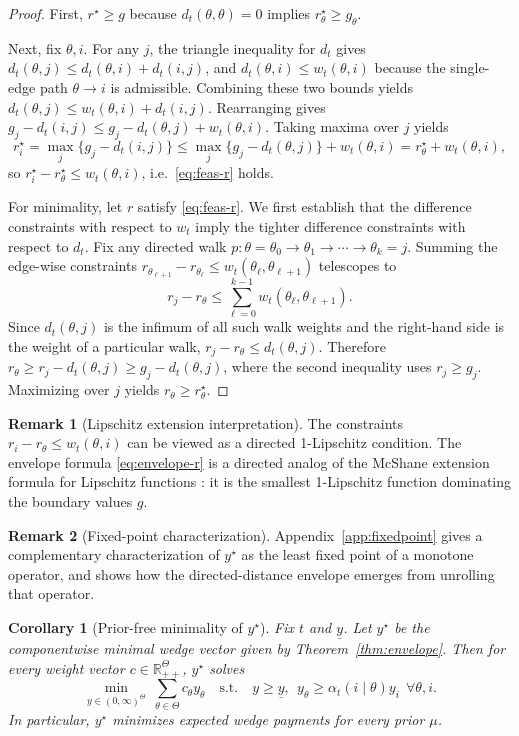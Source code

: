 \documentclass[final,3p,times]{elsarticle}
\theoremstyle{plain}
\newtheorem{corollary}{Corollary}
\theoremstyle{definition}
\newtheorem{remark}{Remark}
\newcommand{\R}{\mathbb{R}}
\newcommand{\1}{\mathbbm{1}}
\newcommand{\ThetaSet}{\Theta}
\begin{document}
\begin{proof}
First, $r^\star\ge g$ because $d_t(\theta,\theta)=0$ implies $r^\star_\theta\ge g_\theta$. 

Next, fix $\theta,i$. For any $j$, the triangle inequality for $d_t$ gives $d_t(\theta,j)\le d_t(\theta,i)+d_t(i,j)$, and $d_t(\theta,i)\le w_t(\theta,i)$ because the single-edge path $\theta\to i$ is admissible. Combining these two bounds yields $d_t(\theta,j)\le w_t(\theta,i)+d_t(i,j)$.
Rearranging gives $g_j-d_t(i,j)\le g_j-d_t(\theta,j)+w_t(\theta,i)$. Taking maxima over $j$ yields
\[
r^\star_i=\max_j\{g_j-d_t(i,j)\}\le \max_j\{g_j-d_t(\theta,j)\}+w_t(\theta,i)=r^\star_\theta+w_t(\theta,i),
\]
so $r^\star_i-r^\star_\theta\le w_t(\theta,i)$, i.e.\ \eqref{eq:feas-r} holds.

For minimality, let $r$ satisfy \eqref{eq:feas-r}. We first establish that the difference constraints with respect to $w_t$ imply the tighter difference constraints with respect to $d_t$. Fix any directed walk $p:\theta=\theta_0\to\theta_1\to\cdots\to\theta_k=j$. Summing the edge-wise constraints $r_{\theta_{\ell+1}}-r_{\theta_\ell}\le w_t(\theta_\ell,\theta_{\ell+1})$ telescopes to
\[
r_j-r_\theta \le \sum_{\ell=0}^{k-1} w_t(\theta_\ell,\theta_{\ell+1}).
\]
Since $d_t(\theta,j)$ is the infimum of all such walk weights and the right-hand side is the weight of a particular walk, $r_j-r_\theta\le d_t(\theta,j)$. Therefore $r_\theta\ge r_j-d_t(\theta,j)\ge g_j-d_t(\theta,j)$, where the second inequality uses $r_j\ge g_j$. Maximizing over $j$ yields $r_\theta\ge r^\star_\theta$.
\end{proof}

\begin{remark}[Lipschitz extension interpretation]
The constraints $r_i-r_\theta\le w_t(\theta,i)$ can be viewed as a directed 1-Lipschitz condition. The envelope formula \eqref{eq:envelope-r} is a directed analog of the McShane extension formula for Lipschitz functions \citep{McShane1934,Petrakis2020}: it is the smallest 1-Lipschitz function dominating the boundary values $g$.
\end{remark}

\begin{remark}[Fixed-point characterization]
Appendix~\ref{app:fixedpoint} gives a complementary characterization of $y^\star$ as the least fixed point of a monotone
operator, and shows how the directed-distance envelope emerges from unrolling that operator.
\end{remark}

\begin{corollary}[Prior-free minimality of $y^\star$]\label{cor:priorfree}
Fix $t$ and $\underline y$. Let $y^\star$ be the componentwise minimal wedge vector given by Theorem~\ref{thm:envelope}.
Then for every weight vector $c\in\R_{++}^{\ThetaSet}$, $y^\star$ solves
\[
\min_{y\in(0,\infty)^{\ThetaSet}}\ \sum_{\theta\in\ThetaSet} c_\theta y_\theta
\quad\text{s.t.}\quad
y\ge \underline y,\ \ y_\theta\ge \alpha_t(i\mid\theta)y_i\ \ \forall \theta,i.
\]
In particular, $y^\star$ minimizes expected wedge payments for every prior $\mu$.
\end{corollary}
\end{document}
